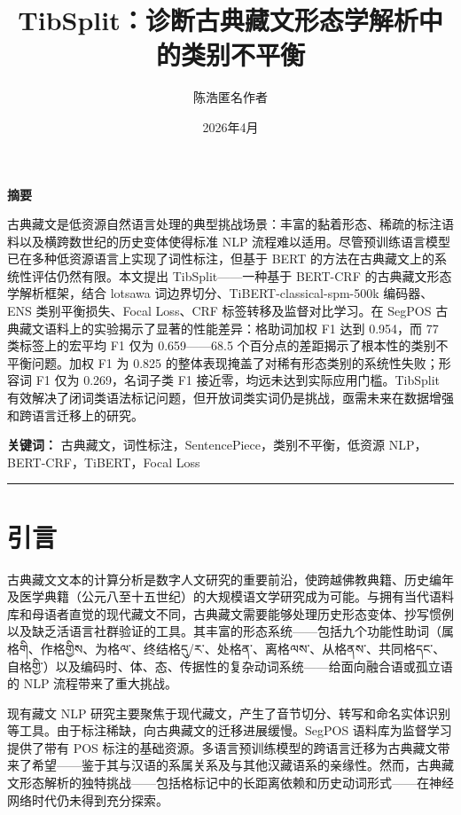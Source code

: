 \documentclass[11pt,a4paper]{article}
\title{\textbf{TibSplit：诊断古典藏文形态学解析中的类别不平衡}}
\author{陈浩\quad 匿名作者}
\date{2026年4月}
\DeclareRobustCommand\tib[1]{{\tibetan #1}}
\begin{document}
\maketitle\thispagestyle{empty}

\begin{center}\textbf{摘要}\end{center}

古典藏文是低资源自然语言处理的典型挑战场景：丰富的黏着形态、稀疏的标注语料以及横跨数世纪的历史变体使得标准 NLP 流程难以适用。尽管预训练语言模型已在多种低资源语言上实现了词性标注，但基于 BERT 的方法在古典藏文上的系统性评估仍然有限。本文提出 TibSplit——一种基于 BERT-CRF 的古典藏文形态学解析框架，结合 lotsawa 词边界切分、TiBERT-classical-spm-500k 编码器、ENS 类别平衡损失、Focal Loss、CRF 标签转移及监督对比学习。在 SegPOS 古典藏文语料上的实验揭示了显著的性能差异：格助词加权 F1 达到 0.954，而 77 类标签上的宏平均 F1 仅为 0.659——68.5 个百分点的差距揭示了根本性的类别不平衡问题。加权 F1 为 0.825 的整体表现掩盖了对稀有形态类别的系统性失败；形容词 F1 仅为 0.269，名词子类 F1 接近零，均远未达到实际应用门槛。TibSplit 有效解决了闭词类语法标记问题，但开放词类实词仍是挑战，亟需未来在数据增强和跨语言迁移上的研究。

\vspace{1em}\noindent\textbf{关键词：} 古典藏文，词性标注，SentencePiece，类别不平衡，低资源 NLP，BERT-CRF，TiBERT，Focal Loss
\vspace{1em}\hrule\vspace{1em}

\section{引言}

古典藏文文本的计算分析是数字人文研究的重要前沿，使跨越佛教典籍、历史编年及医学典籍（公元八至十五世纪）的大规模语文学研究成为可能。与拥有当代语料库和母语者直觉的现代藏文不同，古典藏文需要能够处理历史形态变体、抄写惯例以及缺乏活语言社群验证的工具。其丰富的形态系统——包括九个功能性助词（属格\tib{གི}、作格\tib{གྱིས}、为格\tib{ལ་}、终结格\tib{དུ/ར་}、处格\tib{ན་}、离格\tib{ལས་}、从格\tib{ནས་}、共同格\tib{དང་}、自格\tib{གྱི་}）以及编码时、体、态、传据性的复杂动词系统——给面向融合语或孤立语的 NLP 流程带来了重大挑战。

现有藏文 NLP 研究主要聚焦于现代藏文，产生了音节切分、转写和命名实体识别等工具。由于标注稀缺，向古典藏文的迁移进展缓慢。SegPOS 语料库为监督学习提供了带有 POS 标注的基础资源。多语言预训练模型的跨语言迁移为古典藏文带来了希望——鉴于其与汉语的系属关系及与其他汉藏语系的亲缘性。然而，古典藏文形态解析的独特挑战——包括格标记中的长距离依赖和历史动词形式——在神经网络时代仍未得到充分探索。
\end{document}
